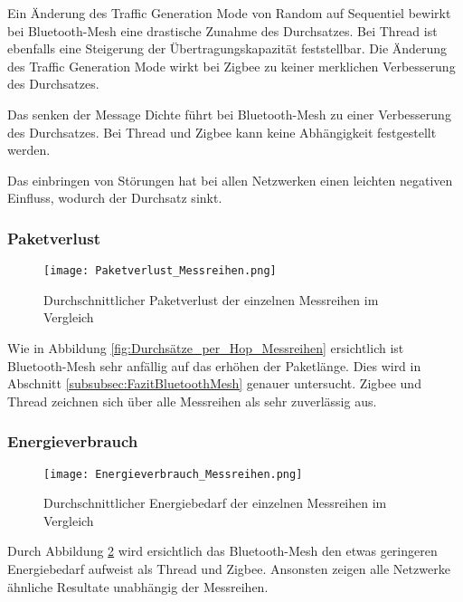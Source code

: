 Ein Änderung des Traffic Generation Mode von Random auf Sequentiel bewirkt bei Bluetooth-Mesh eine drastische Zunahme des Durchsatzes. Bei Thread ist ebenfalls eine Steigerung der Übertragungskapazität feststellbar. Die Änderung des Traffic Generation Mode wirkt bei Zigbee zu keiner merklichen Verbesserung des Durchsatzes.

Das senken der Message Dichte führt bei Bluetooth-Mesh zu einer Verbesserung des Durchsatzes. Bei Thread und Zigbee kann keine Abhängigkeit festgestellt werden.

Das einbringen von Störungen hat bei allen Netzwerken einen leichten negativen Einfluss, wodurch der Durchsatz sinkt. 

\subsubsection{Paketverlust}\label{subsec:VergleichPaketverlustMessreihen}


\begin{figure}
	\centering
	\texttt{[image: Paketverlust\_Messreihen.png]}
	\caption{Durchschnittlicher Paketverlust der einzelnen Messreihen im Vergleich}\label{fig:PaketverlusteMessreihen}
\end{figure}

Wie in Abbildung \ref{fig:Durchsätze_per_Hop_Messreihen} ersichtlich ist Bluetooth-Mesh sehr anfällig auf das erhöhen der Paketlänge. Dies wird in Abschnitt \ref{subsubsec:FazitBluetoothMesh} genauer untersucht. Zigbee und Thread zeichnen sich über alle Messreihen als sehr zuverlässig aus. 


\subsubsection{Energieverbrauch}\label{subsec:VergleichEnergieverbrauchMessreihen}


\begin{figure}[H]
	\centering
	\texttt{[image: Energieverbrauch\_Messreihen.png]}
	\caption{Durchschnittlicher Energiebedarf der einzelnen Messreihen im Vergleich}\label{fig:EnergieverbrauchMessreihen}
\end{figure}

Durch Abbildung \ref{fig:EnergieverbrauchMessreihen} wird ersichtlich das Bluetooth-Mesh den etwas geringeren Energiebedarf aufweist als Thread und Zigbee. Ansonsten zeigen alle Netzwerke ähnliche Resultate unabhängig der Messreihen. 


